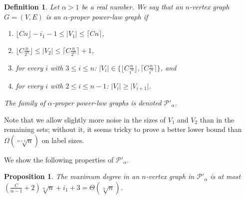\documentclass{article}
\newtheorem{definition}{Definition}
\newtheorem{proposition}{Proposition}
\theoremstyle{remark}
\newcommand{\PLC}{\ensuremath{ \mathcal{P}'_{\alpha}}}
\begin{document}
\begin{definition}\label{def:proper}
Let $\alpha > 1$ be a real number. We say that an $n$-vertex graph  $G=(V,E)$ is an  $\alpha$-\emph{proper power-law graph} 
if
\begin{enumerate}
\item $\lfloor Cn\rfloor - i_1 - 1\leq\vert V_1\vert\leq\lceil Cn\rceil$,
\item $\lfloor C\frac n{2^\alpha}\rfloor\leq\vert V_2\vert\leq\lceil C\frac n{2^\alpha}\rceil + 1$,
\item for every $i$ with $3 \leq i \leq n$:  $\vert V_i \vert\in \{\lfloor C\frac{n}{i^{\alpha}} \rfloor, \lceil C \frac{n}{i^{\alpha}} \rceil\}$, and
\item for every $i$ with $2 \leq i \leq n-1$: $\vert V_i \vert \geq \vert V_{i+1} \vert$.
\end{enumerate}
The family of $\alpha$-proper power-law graphs is denoted $\PLC$.
\end{definition}
Note that we allow slightly more noise in the sizes of $V_1$ and $V_2$ than in the remaining sets; without it, it seems tricky to prove a better lower bound than $\Omega(\sqrt[\alpha+1]{n})$ on label sizes.

We show the following properties of $\PLC$. 
\begin{proposition}\label{prop:maxvertexproper}\label{prop:maxdegree}
The maximum degree in an $n$-vertex graph in $\PLC$ is at most $\left(\frac{C}{\alpha - 1} + 2\right) \sqrt[\alpha]{n} + i_1 + 3 = \Theta(\sqrt[\alpha]n)$.
\end{proposition}
\end{document}

